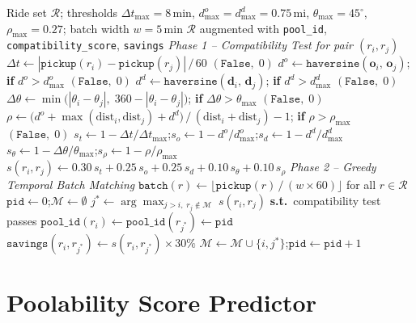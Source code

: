 \begin{algorithm}[t]
\caption{Multi-Criteria Ride Pooling (Compatibility Test and Greedy Matching)}
\label{alg:ride_pool}
\begin{algorithmic}[1]
\Require Ride set $\mathcal{R}$; thresholds $\Delta t_{\max}{=}8$\,min, $d^o_{\max}{=}d^d_{\max}{=}0.75$\,mi, $\theta_{\max}{=}45^\circ$, $\rho_{\max}{=}0.27$; batch width $w{=}5$\,min
\Ensure $\mathcal{R}$ augmented with \texttt{pool\_id}, \texttt{compatibility\_score}, \texttt{savings}
\Statex \textit{Phase 1 -- Compatibility Test for pair $(r_i, r_j)$}
\State $\Delta t \gets |\texttt{pickup}(r_i) - \texttt{pickup}(r_j)|\,/\,60$
 \Return $(\mathtt{False},\;0)$ \EndIf
\State $d^o \gets \texttt{haversine}(\mathbf{o}_i,\,\mathbf{o}_j)$; \textbf{if} $d^o > d^o_{\max}$ \Return $(\mathtt{False},\;0)$
\State $d^d \gets \texttt{haversine}(\mathbf{d}_i,\,\mathbf{d}_j)$; \textbf{if} $d^d > d^d_{\max}$ \Return $(\mathtt{False},\;0)$
\State $\Delta\theta \gets \min\bigl(|\theta_i-\theta_j|,\;360-|\theta_i-\theta_j|\bigr)$; \textbf{if} $\Delta\theta > \theta_{\max}$ \Return $(\mathtt{False},\;0)$
\State $\rho \gets \bigl(d^o + \max(\mathrm{dist}_i, \mathrm{dist}_j) + d^d\bigr)\,/\,(\mathrm{dist}_i + \mathrm{dist}_j) - 1$; \textbf{if} $\rho > \rho_{\max}$ \Return $(\mathtt{False},\;0)$
\State $s_t \gets 1-\Delta t/\Delta t_{\max}$;\enspace $s_o \gets 1-d^o/d^o_{\max}$;\enspace $s_d \gets 1-d^d/d^d_{\max}$
\State $s_\theta \gets 1-\Delta\theta/\theta_{\max}$;\enspace $s_\rho \gets 1-\rho/\rho_{\max}$
\State $s(r_i,r_j) \gets 0.30\,s_t + 0.25\,s_o + 0.25\,s_d + 0.10\,s_\theta + 0.10\,s_\rho$
\Statex \textit{Phase 2 -- Greedy Temporal Batch Matching}
\State $\texttt{batch}(r) \gets \lfloor\texttt{pickup}(r)\,/\,(w\!\times\!60)\rfloor$ \; for all $r\in\mathcal{R}$
\State $\texttt{pid} \gets 0$;\quad $\mathcal{M} \gets \emptyset$
 \State $j^* \gets \arg\max_{j>i,\;r_j\notin\mathcal{M}}\;s(r_i,r_j)$ \textbf{s.t.}\ compatibility test passes
 \State $\texttt{pool\_id}(r_i)\gets\texttt{pool\_id}(r_{j^*})\gets\texttt{pid}$
 \State $\texttt{savings}(r_i,r_{j^*})\gets s(r_i,r_{j^*})\times 30\%$
 \State $\mathcal{M}\gets\mathcal{M}\cup\{i,j^*\}$;\quad $\texttt{pid}\gets\texttt{pid}+1$
 \EndIf
 \EndFor
\EndFor
\end{algorithmic}
\end{algorithm}

\section{Poolability Score Predictor}
\label{sec:poolability}

